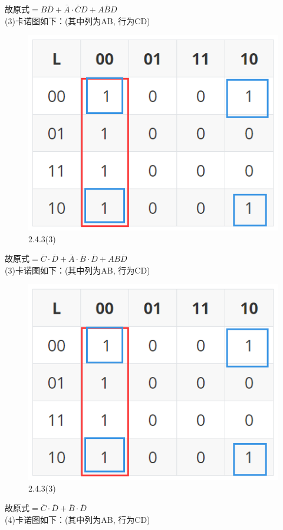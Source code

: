\documentclass[a4paper,11pt,UTF8]{article}
\begin{document}
故原式$=B\overline{D}+\overline{A}\cdot\overline{C}D+A\overline{B}D$\\
(3)卡诺图如下：(其中列为AB, 行为CD)
\begin{figure}[H] 
	\centering 
	\includegraphics[scale=0.30]{SD2.4.3_3.png}
	\caption{2.4.3(3)}
\end{figure}
故原式$=\overline{C}\cdot\overline{D}+\overline{A}\cdot\overline{B}\cdot\overline{D}+AB\overline{D}$\\
(3)卡诺图如下：(其中列为AB, 行为CD)
\begin{figure}[H] 
	\centering 
	\includegraphics[scale=0.30]{SD2.4.3_3.png}
	\caption{2.4.3(3)}
\end{figure}
故原式$=\overline{C}\cdot\overline{D}+\overline{B}\cdot\overline{D}$\\
(4)卡诺图如下：(其中列为AB, 行为CD)
\end{document}
